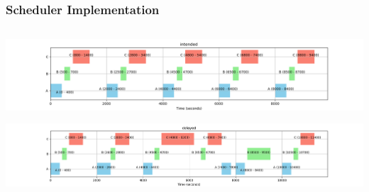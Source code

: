 \documentclass{beamer}
\begin{document}
\begin{frame}
\frametitle{Scheduler Implementation}
\begin{columns}

\begin{column}{1.2\textwidth}
  \includegraphics[width=\linewidth]{intended.png}
  
  \includegraphics[width=\linewidth]{delayed.png}
\end{column}



\end{columns}
\end{frame}
\end{document}
